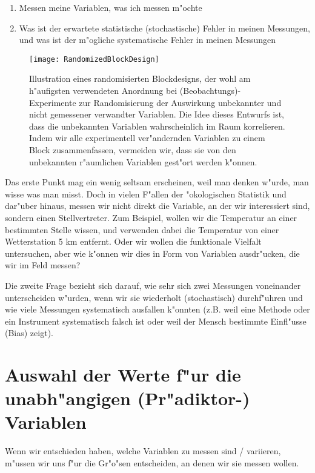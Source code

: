 \documentclass[a4paper,twoside]{tufte-book}\usepackage[]{graphicx}\usepackage[]{color}
\begin{document}
\begin{enumerate}
  \item Messen meine Variablen, was ich messen m"ochte
  \item Was ist der erwartete statistische (stochastische) Fehler in meinen Messungen, und was ist der m"ogliche systematische Fehler in meinen Messungen
\end{enumerate}

\begin{figure}[]
\begin{center}
\texttt{[image: RandomizedBlockDesign]}
\caption{Illustration eines randomisierten Blockdesigns, der wohl am h"aufigsten verwendeten Anordnung bei (Beobachtungs)-Experimente zur Randomisierung der Auswirkung unbekannter und nicht gemessener verwandter Variablen. Die Idee dieses Entwurfs ist, dass die unbekannten Variablen wahrscheinlich im Raum korrelieren. Indem wir alle experimentell ver"andernden Variablen zu einem Block zusammenfassen, vermeiden wir, dass sie von den unbekannten r"aumlichen Variablen gest"ort werden k"onnen.}
\label{fig: RandomizedBlockDesign}
\end{center}
\end{figure}


Das erste Punkt mag ein wenig seltsam erscheinen, weil man denken w"urde, man wisse was man misst. Doch in vielen F"allen der "okologischen Statistik und dar"uber hinaus, messen wir nicht direkt die Variable, an der wir interessiert sind, sondern einen Stellvertreter. Zum Beispiel, wollen wir die Temperatur an einer bestimmten Stelle wissen, und verwenden dabei die Temperatur von einer Wetterstation 5 km entfernt. Oder wir wollen die funktionale Vielfalt untersuchen, aber wie k"onnen wir dies in Form von Variablen ausdr"ucken, die wir im Feld messen?

Die zweite Frage bezieht sich darauf, wie sehr sich zwei Messungen voneinander unterscheiden w"urden, wenn wir sie wiederholt (stochastisch) durchf"uhren und wie viele Messungen systematisch ausfallen k"onnten (z.B. weil eine Methode oder ein Instrument systematisch falsch ist oder weil der Mensch bestimmte Einfl"usse (Bias) zeigt).


\section{Auswahl der Werte f"ur die unabh"angigen (Pr"adiktor-) Variablen}

Wenn wir entschieden haben, welche Variablen zu messen sind / variieren, m"ussen wir uns f"ur die Gr"o"sen entscheiden, an denen wir sie messen wollen.
\end{document}
